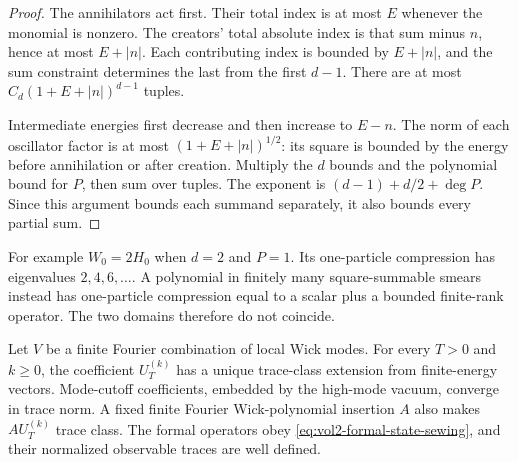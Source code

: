 \begin{proof}
The annihilators act first. Their total index is at most \(E\)
whenever the monomial is nonzero. The creators' total absolute index
is that sum minus \(n\), hence at most \(E+|n|\).
Each contributing index is bounded by \(E+|n|\), and the sum
constraint determines the last from the first \(d-1\).
There are at most \(C_d(1+E+|n|)^{d-1}\) tuples.

Intermediate energies first decrease and then increase to \(E-n\).
The norm of each oscillator factor is at most
\((1+E+|n|)^{1/2}\): its square is bounded by the energy before
annihilation or after creation. Multiply the \(d\) bounds and
the polynomial bound for \(P\), then sum over tuples.
The exponent is \((d-1)+d/2+\deg P\). Since this argument bounds
each summand separately, it also bounds every partial sum.
\end{proof}

For example \(W_0=2H_0\) when \(d=2\) and \(P=1\).
Its one-particle compression has eigenvalues \(2,4,6,\ldots\).
A polynomial in finitely many square-summable smears instead has
one-particle compression equal to a scalar plus a bounded finite-rank
operator. The two domains therefore do not coincide.

\begin{theorem}\label{thm:vol2-local-mode-dyson}
Let \(V\) be a finite Fourier combination of local Wick modes.
For every \(T>0\) and \(k\geq0\), the coefficient
\(U_T^{(k)}\) has a unique trace-class extension from finite-energy
vectors. Mode-cutoff coefficients, embedded by the high-mode vacuum,
converge in trace norm. A fixed finite Fourier Wick-polynomial
insertion \(A\) also makes \(A U_T^{(k)}\) trace class.
The formal operators obey \eqref{eq:vol2-formal-state-sewing}, and
their normalized observable traces are well defined.
\end{theorem}

